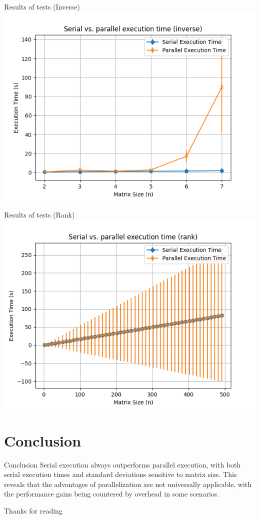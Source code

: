 \documentclass{beamer}
\begin{document}
\begin{frame}[fragile]{Results of tests (Inverse)}
    \centering
    \includegraphics[width=\textwidth]{../img/inv_2_8_3.png}
\end{frame}

\begin{frame}[fragile]{Results of tests (Rank)}
    \centering
    \includegraphics[width=\textwidth]{../img/rank_2_500_5.png}
\end{frame}

\section{Conclusion}
\begin{frame}[fragile]{Conclusion}
    Serial execution always outperforms parallel execution, with both serial execution times and standard deviations sensitive to matrix size. This reveals that the advantages of parallelization are not universally applicable, with the performance gains being countered by overhead in some scenarios.
\end{frame}

\begin{frame}[standout]
    Thanks for reading
    \\
    \Huge\smiley{}
\end{frame}
\end{document}
